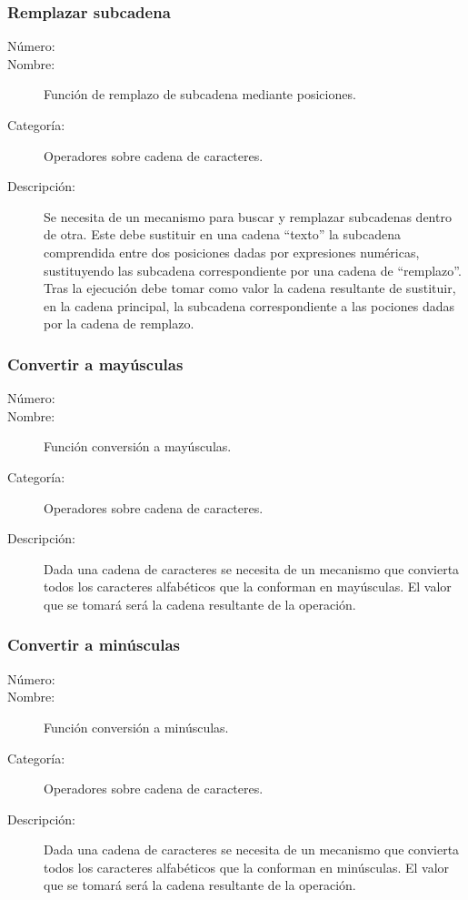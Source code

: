 \subsubsection{Remplazar subcadena}
\begin{framed}
	\begin{description}
		\item [Número:] \cn
		\item [Nombre:] Función de remplazo de subcadena mediante posiciones.
		\item [Categoría:] Operadores sobre cadena de caracteres.
		\item [Descripción:] Se necesita de un mecanismo para buscar y remplazar subcadenas dentro de otra.
		Este debe sustituir en una cadena ``texto'' la subcadena comprendida entre dos posiciones dadas por 
      expresiones numéricas, sustituyendo las subcadena correspondiente por una cadena de ``remplazo''. 
      Tras la ejecución debe tomar como valor la cadena
		resultante de sustituir, en la cadena principal, la subcadena correspondiente a las pociones dadas por la cadena de remplazo.
      
	\end {description}
\end{framed}

\subsubsection{Convertir a mayúsculas}
\begin{framed}
	\begin{description}
		\item [Número:] \cn
		\item [Nombre:] Función conversión a mayúsculas.
		\item [Categoría:] Operadores sobre cadena de caracteres.
		\item [Descripción:] Dada una cadena de caracteres se necesita de un mecanismo que convierta todos los caracteres
		alfabéticos que la conforman en mayúsculas. El valor que se tomará será la cadena resultante de la operación.
	\end {description}
\end{framed}

\subsubsection{Convertir a minúsculas}
\begin{framed}
	\begin{description}
		\item [Número:] \cn
		\item [Nombre:] Función conversión a minúsculas.
		\item [Categoría:] Operadores sobre cadena de caracteres.
		\item [Descripción:] Dada una cadena de caracteres se necesita de un mecanismo que convierta todos los caracteres
		alfabéticos que la conforman en minúsculas. El valor que se tomará será la cadena resultante de la operación.
	\end {description}
\end{framed}
